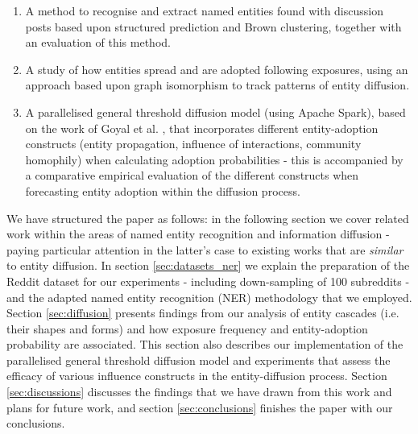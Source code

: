\documentclass[review]{elsarticle}
\begin{document}
\begin{enumerate}
	\item A method to recognise and extract named entities found with discussion posts based upon structured prediction and Brown clustering, together with an evaluation of this method.
	\item A study of how entities spread and are adopted following exposures, using an approach based upon graph isomorphism to track patterns of entity diffusion.
	\item A parallelised general threshold diffusion model (using Apache Spark), based on the work of Goyal et al. \cite{goyal2010learning}, that incorporates different entity-adoption constructs (entity propagation, influence of interactions, community homophily) when calculating adoption probabilities - this is accompanied by a comparative empirical evaluation of the different constructs when forecasting entity adoption within the diffusion process.
\end{enumerate}

We have structured the paper as follows: in the following section we cover related work within the areas of named entity recognition and information diffusion - paying particular attention in the latter's case to existing works that are \emph{similar} to entity diffusion.
In section \ref{sec:datasets_ner} we explain the preparation of the Reddit dataset for our experiments - including down-sampling of 100 subreddits - and the adapted named entity recognition (NER) methodology that we employed.
Section \ref{sec:diffusion} presents findings from our analysis of entity cascades (i.e. their shapes and forms) and how exposure frequency and entity-adoption probability are associated.
This section also describes our implementation of the parallelised general threshold diffusion model and experiments that assess the efficacy of various influence constructs in the entity-diffusion process.
Section \ref{sec:discussions} discusses the findings that we have drawn from this work and plans for future work, and section \ref{sec:conclusions} finishes the paper with our conclusions.
\end{document}
